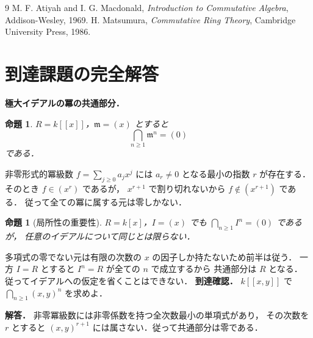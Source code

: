 \documentclass[a5paper,10pt,onecolumn]{jsarticle}
\makeatletter
\theoremstyle{mathnotetheorem}
\newtheorem{proposition}[theorem]{命題}
\renewcommand{\proofname}{証明}
\renewenvironment{proof}[1][\proofname]{%
  \par\pushQED{\qed}\normalfont\topsep4\p@\@plus2\p@\relax
  \trivlist\item[\hskip\labelsep\bfseries #1]\ignorespaces
}{\popQED\endtrivlist\@endpefalse}
\makeatother
\begin{document}
\begin{thebibliography}{9}
 M. F. Atiyah and I. G. Macdonald,
 \emph{Introduction to Commutative Algebra}, Addison-Wesley, 1969.
 H. Matsumura,
 \emph{Commutative Ring Theory}, Cambridge University Press, 1986.
\end{thebibliography}

\section{到達課題の完全解答}
\noindent\textbf{極大イデアルの冪の共通部分．}
\begin{proposition}
$R=k[[x]]$，$\mathfrak m=(x)$ とすると
\[
\bigcap_{n\ge1}\mathfrak m^n=(0)
\]
である．
\end{proposition}
\begin{proof}
非零形式的冪級数 $f=\sum_{j\ge0}a_jx^j$ には
$a_r\ne0$ となる最小の指数 $r$ が存在する．
そのとき $f\in(x^r)$ であるが，
$x^{r+1}$ で割り切れないから
$f\notin(x^{r+1})$ である．
従って全ての冪に属する元は零しかない．
\end{proof}
\begin{proposition}[局所性の重要性]
$R=k[x]$，$I=(x)$ でも
$\bigcap_{n\ge1}I^n=(0)$ であるが，
任意のイデアルについて同じとは限らない．
\end{proposition}
\begin{proof}
多項式の零でない元は有限の次数の
$x$ の因子しか持たないため前半は従う．
一方 $I=R$ とすると
$I^n=R$ が全ての $n$ で成立するから
共通部分は $R$ となる．
従ってイデアルへの仮定を省くことはできない．
\end{proof}
\noindent\textbf{到達確認．}
$k[[x,y]]$ で
$\bigcap_{n\ge1}(x,y)^n$ を求めよ．
\par\noindent\textbf{解答．}
非零冪級数には非零係数を持つ全次数最小の単項式があり，
その次数を $r$ とすると
$(x,y)^{r+1}$ には属さない．従って共通部分は零である．
\end{document}
